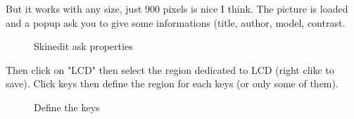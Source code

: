 \documentclass[10pt]{report}
\begin{document}
But it works with any size, just 900 pixels is nice I think.\newline
The picture is loaded and a popup ask you to give some informations (title, author, model, contrast.\newline

\begin{figure}[H]
\centering
{}
\caption{Skinedit ask properties}
\end{figure}


Then click on "LCD" then select the region dedicated to LCD (right clikc to save).\newline
Click keys then define the region for each keys (or only some of them).\newline
\begin{figure}[H]
\centering
{}
\caption{Define the keys}
\end{figure}
\end{document}
